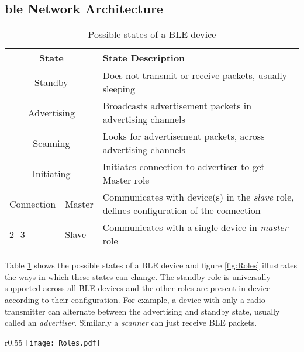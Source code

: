 \subsection[\gls{ble} Network Architecture]{\gls{ble} Network Architecture\cite{BLE101}}

\begin{table}[htbp]
\begin{center}
\vspace{-10pt}
\setlength{\extrarowheight}{1.5pt}
\begin{tabular}{|m{2.5cm}|m{1.2cm}|m{11.4cm}|}
\hline
\multicolumn{ 2}{|c|}{\textbf{State}} & \textbf{State Description} \\ \hline
\multicolumn{ 2}{|c|}{Standby} & Does not transmit or receive packets, usually sleeping \\ \hline
\multicolumn{ 2}{|c|}{Advertising} & Broadcasts advertisement packets in  advertising channels \\ \hline
\multicolumn{ 2}{|c|}{Scanning} & Looks for advertisement packets, across advertising channels \\ \hline
\multicolumn{ 2}{|c|}{Initiating} & Initiates connection to advertiser to get Master role \\ \hline
\multicolumn{ 1}{|m{2.0cm}|}{\hspace{42pt} \mbox{Connection}} & Master & Communicates with device(s) in the \emph{slave} role, defines configuration of the connection \\ \cline{ 2- 3}
\multicolumn{ 1}{|l|}{} & Slave & Communicates with a single device in \emph{master} role \\ \hline
\end{tabular}
\end{center}
\vspace{-12pt}
\caption{Possible states of a BLE device}
\vspace{-6pt}
\label{tbl:BLEstates}
\end{table}

Table \ref{tbl:BLEstates} shows the possible states of a BLE device and figure \ref{fig:Roles} illustrates the ways in which these states can change. The standby role is universally supported across all BLE devices and the other roles are present in device according to their configuration. For example, a device with only a radio transmitter can alternate between the advertising and standby state, usually called an \emph{advertiser}. Similarly a \emph{scanner} can just receive BLE packets.

\begin{wrapfigure}{r}{0.55\textwidth}
\centering
\texttt{[image: Roles.pdf]}
\caption{State diagram of BLE states}
\label{fig:Roles}
\vspace{-10pt}
\end{wrapfigure}

